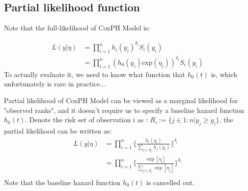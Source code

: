 \documentclass{beamer} %
\begin{document}
\subsection{Partial likelihood function}
\begin{frame}
Note that the full-likelihood of CoxPH Model is:

\begin{equation}\begin{aligned}\label{eqn:full_likelihood}
L(y|\eta) &= \prod_{i=1}^{n} h_{i}(y_i)^{\delta_i}S_{i}(y_i) \\
&= \prod_{i=1}^{n} (h_{0}(y_i) \text{exp}(\eta_i))^{\delta_i}S_{i}(y_i)
\end{aligned}\end{equation}
\pause
To actually evaluate it, we need to know what function that $h_{0}(t)$ is, which unfortunately is rare in practice...
\end{frame}

\begin{frame}

Partial likelihood of CoxPH Model can be viewed as a marginal likelihood for "observed ranks", and it doesn't require us to specify a baseline hazard function $h_{0}(t)$.\newline
\pause
Denote the risk set of observation i as : $R_i := \big\{j \in 1:n | y_j \geq y_i\big\}$, the partial likelihood can be written as: \newline
\pause
\begin{equation}\begin{aligned}\label{eqn:partial}
L(y|\eta) &= \prod_{i=1}^{n} \bigg\{\frac{h_{i}(y_i)}{{\sum_{j\in R_{i}}^{}h_{j}(y_i)}}\bigg \}^{\delta_{i}} \\
&= \prod_{i=1}^{n}\bigg\{\frac{\exp[\eta_{i}]}{{\sum_{j\in R_{i}}^{}\exp[\eta_{j}]}}\bigg \}^{\delta_{i}}\\
\end{aligned}\end{equation}
\pause
Note that the baseline hazard function $h_{0}(t)$ is cancelled out.


\end{frame}
\end{document}
